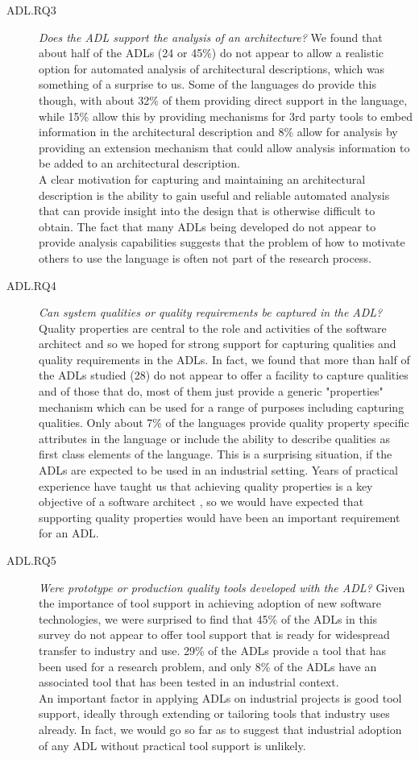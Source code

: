 \begin{description}
\item[ADL.RQ3] \emph{Does the ADL support the analysis of an architecture?}
We found that about half of the ADLs (24 or 45\%) do not appear to allow a realistic option for automated analysis of architectural descriptions, which was something of a surprise to us.  Some of the languages do provide this though, with about 32\% of them providing direct support in the language, while 15\% allow this by providing mechanisms for 3rd party tools to embed information in the architectural description and 8\% allow for analysis by providing an extension mechanism that could allow analysis information to be added to an architectural description. \\
A clear motivation for capturing and maintaining an architectural description is the ability to gain useful and reliable automated analysis that can provide insight into the design that is otherwise difficult to obtain.  The fact that many ADLs being developed do not appear to provide analysis capabilities suggests that the problem of how to motivate others to use the language is often not part of the research process.

\item[ADL.RQ4] \emph{Can system qualities or quality requirements be captured in the ADL?}
Quality properties are central to the role and activities of the software architect and so we hoped for strong support for capturing qualities and quality requirements in the ADLs.  In fact, we found that more than half of the ADLs studied (28) do not appear to offer a facility to capture qualities and of those that do, most of them just provide a generic "properties" mechanism which can be used for a range of purposes including capturing qualities.  Only about 7\% of the languages provide quality property specific attributes in the language or include the ability to describe qualities as first class elements of the language.  This is a surprising situation, if the ADLs are expected to be used in an industrial setting.  Years of practical experience have taught us that achieving quality properties is a key objective of a software architect \cite{brown2018-sad, rozanski2011-ssa2e}, so we would have expected that supporting quality properties would have been an important requirement for an ADL.

\item[ADL.RQ5] \emph{Were prototype or production quality tools developed with the ADL?}
Given the importance of tool support in achieving adoption of new software technologies, we were surprised to find that 45\% of the ADLs in this survey do not appear to offer tool support that is ready for widespread transfer to industry and use.  29\% of the ADLs provide a tool that has been used for a research problem, and only 8\% of the ADLs have an associated tool that has been tested in an industrial context.\\
An important factor in applying ADLs on industrial projects is good tool support, ideally through extending or tailoring tools that industry uses already.  In fact, we would go so far as to suggest that industrial adoption of any ADL without practical tool support is unlikely.


\end{description}
